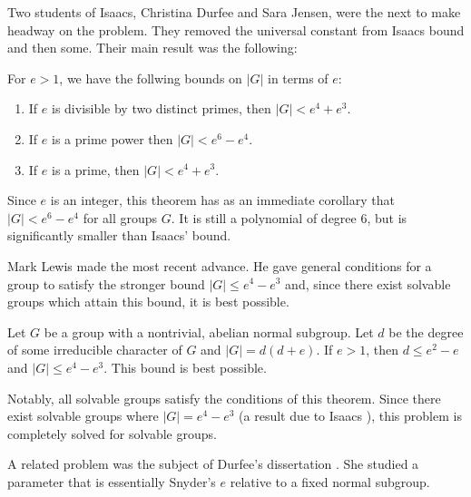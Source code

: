 \documentclass[main.tex]{subfiles}
\begin{document}
Two students of Isaacs, Christina Durfee and Sara Jensen, were the next to make headway on the problem. They removed the universal constant from Isaacs bound and then some. Their main result was the following:

\hss

\begin{theorem}
For $e > 1$, we have the follwing bounds on $|G|$ in terms of $e$:
\begin{enumerate}
	\item If $e$ is divisible by two distinct primes, then $|G| < e^4 + e^3$.
	\item If $e$ is a prime power then $|G| < e^6 - e^4$.
	\item If $e$ is a prime, then $|G| < e^4 + e^3$.
\end{enumerate}
\end{theorem}

\hss

\noindent Since $e$ is an integer, this theorem has as an immediate corollary that $|G| < e^6 - e^4$ for all groups $G$. It is still a polynomial of degree 6, but is significantly smaller than Isaacs' bound.

Mark Lewis made the most recent advance. He gave general conditions \cite{lewisarticle} for a group to satisfy the stronger bound $|G| \le e^4 - e^3$ and, since there exist solvable groups which attain this bound, it is best possible.

\hss

\begin{theorem} Let $G$ be a group with a nontrivial, abelian normal subgroup. Let $d$ be the degree of some irreducible character of $G$ and $|G| = d(d+e)$. If $e > 1$, then $d \le e^2 - e$ and $|G| \le e^4 - e^3$. This bound is best possible.
\end{theorem}

\hss

\noindent Notably, all solvable groups satisfy the conditions of this theorem. Since there exist solvable groups where $|G| = e^4 - e^3$ (a result due to Isaacs \cite{isaacsarticle}), this problem is completely solved for solvable groups. 

\hss

A related problem was the subject of Durfee's dissertation \cite{durfeedissertation}. She studied a parameter that is essentially Snyder's $e$ relative to a fixed normal subgroup. 

\hss
\end{document}
